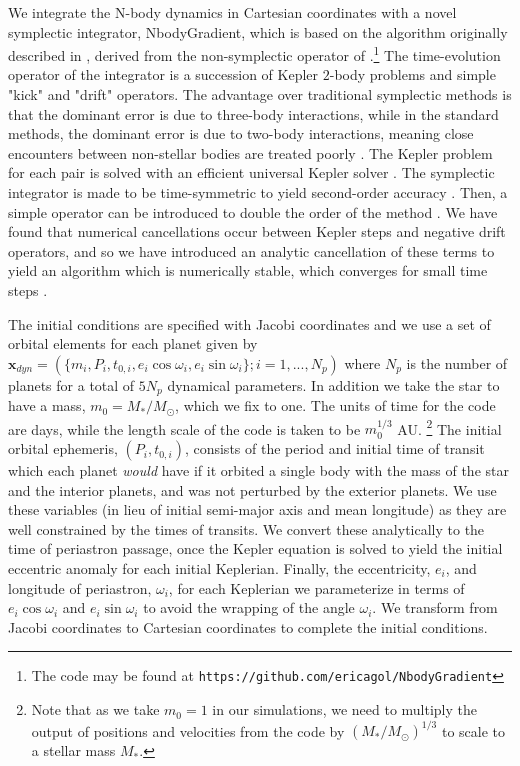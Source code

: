 \documentclass[twocolumn]{aastex63}
\begin{document}
We integrate the N-body dynamics in Cartesian coordinates with a novel symplectic 
integrator, \textsf{NbodyGradient}, which is based on the algorithm originally described in \cite{Hernandez2015}, derived from the non-symplectic operator of \cite{GoncalvesFerrari2014}.\footnote{The code may be found at 
\texttt{https://github.com/ericagol/NbodyGradient}}  The time-evolution operator of the integrator is a succession of Kepler $2$-body problems and simple "kick" and "drift" operators.  %
The advantage over traditional symplectic methods \citep{Wisdom1991} is that the dominant error is due to three-body interactions, while in the standard methods, the dominant error is due to two-body interactions, meaning close encounters between non-stellar bodies are treated poorly \citep{Hernandez2017}.    The Kepler problem
for each pair is solved with an efficient universal Kepler solver \citep{Wisdom2015}.
The symplectic integrator is made to be time-symmetric to yield second-order
accuracy \citep{Hernandez2015}.  Then, a simple operator can be introduced to double the order of the method \citep{Dehnen2017}.
We have found that numerical cancellations occur between Kepler steps
and negative drift operators, and so we have introduced an analytic cancellation
of these terms to yield an algorithm which is numerically stable,
which converges for small time steps \citep{Agol2020}.

The initial conditions are specified with Jacobi coordinates and
we use a set of orbital elements for each planet given by
$\mathbf{x}_{dyn} = (\{m_i,P_i,t_{0,i},e_i \cos{\omega_i},e_i\sin{\omega_i}\}; i = 1,...,N_p)$ 
where $N_p$ is the number of planets for a total of $5N_p$ dynamical parameters. In
addition we take the star to have a mass, $m_0 = M_*/M_\odot$, which we fix to one.
The units of time for the code are days, while the length scale of the code is taken to be $m_0^{1/3}$ AU. \footnote{Note that as we take $m_0=1$ in our simulations, we need to multiply
the output of positions and velocities from the code by $(M_*/M_\odot)^{1/3}$ to scale to a stellar mass $M_*$.}
The initial orbital ephemeris, $(P_i,t_{0,i})$, consists of the period and initial time of
transit which each planet {\it would} have if it orbited a single
body with the mass of the star and the interior planets, and was
not perturbed by the exterior planets.  We use these variables (in lieu of initial semi-major axis and mean longitude) as
they are well constrained by the times of transits.  We convert
these analytically to the time of periastron passage, once the
Kepler equation is solved to yield the initial eccentric anomaly
for each initial Keplerian.  Finally, the eccentricity, $e_i$, and
longitude of periastron, $\omega_i$, for each Keplerian we
parameterize in terms of $e_i\cos{\omega_i}$ and $e_i\sin{\omega_i}$
to avoid the wrapping of the angle $\omega_i$.   We transform from Jacobi coordinates to Cartesian coordinates to complete the initial conditions.
\end{document}
